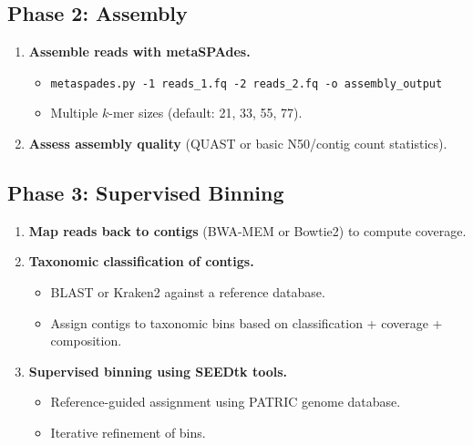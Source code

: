\documentclass[11pt,a4paper]{article}
\begin{document}
\subsection{Phase 2: Assembly}
\begin{enumerate}[label=\textbf{2.\arabic*}]
  \item \textbf{Assemble reads with metaSPAdes.}
    \begin{itemize}
      \item \texttt{metaspades.py -1 reads\_1.fq -2 reads\_2.fq -o assembly\_output}
      \item Multiple $k$-mer sizes (default: 21, 33, 55, 77).
    \end{itemize}
  \item \textbf{Assess assembly quality} (QUAST or basic N50/contig count statistics).
\end{enumerate}

\subsection{Phase 3: Supervised Binning}
\begin{enumerate}[label=\textbf{3.\arabic*}]
  \item \textbf{Map reads back to contigs} (BWA-MEM or Bowtie2) to compute coverage.
  \item \textbf{Taxonomic classification of contigs.}
    \begin{itemize}
      \item BLAST or Kraken2 against a reference database.
      \item Assign contigs to taxonomic bins based on classification + coverage + composition.
    \end{itemize}
  \item \textbf{Supervised binning using SEEDtk tools.}
    \begin{itemize}
      \item Reference-guided assignment using PATRIC genome database.
      \item Iterative refinement of bins.
    \end{itemize}
\end{enumerate}
\end{document}
